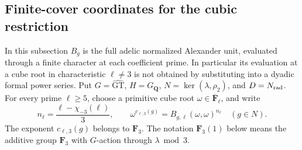 \subsection{Finite-cover coordinates for the cubic restriction}

In this subsection \(B_g\) is the full adelic normalized Alexander
unit, evaluated through a finite character at each coefficient prime.
In particular its evaluation at a cube root in characteristic
\(\ell\ne3\) is not obtained by substituting into a dyadic formal
power series. Put \(G=\widehat{\mathrm{GT}}\),
\(H=G_{\mathbf Q}\), \(N=\ker(\lambda,\rho_2)\), and
\(D=N_{\rm rad}\).
For every prime \(\ell\ge5\), choose a primitive cube root
\(\omega\in\overline{\mathbf F}_\ell\), and write
\[
 n_\ell=\frac{\ell-\chi_{-3}(\ell)}3,\qquad
 \omega^{c_{\ell,3}(g)}
       =B_{g,\ell}(\omega,\omega)^{n_\ell}\quad(g\in N).
\]
The exponent \(c_{\ell,3}(g)\) belongs to \(\mathbf F_3\).
The notation \(\mathbf F_3(1)\) below means the additive group
\(\mathbf F_3\) with \(G\)-action through \(\lambda\bmod3\).

